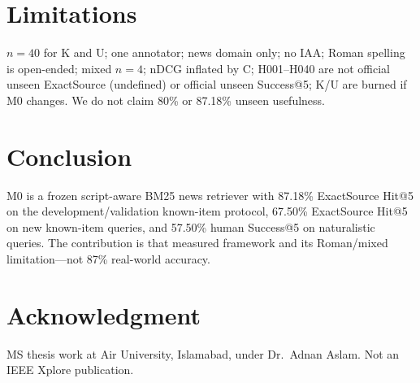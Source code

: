 \documentclass[conference]{IEEEtran}
\begin{document}
\section{Limitations}

$n=40$ for K and U; one annotator; news domain only; no IAA; Roman spelling is open-ended; mixed $n=4$; nDCG inflated by C; H001--H040 are not official unseen ExactSource (undefined) or official unseen Success@5; K/U are burned if M0 changes. We do not claim 80\% or 87.18\% unseen usefulness.

\section{Conclusion}

M0 is a frozen script-aware BM25 news retriever with 87.18\% ExactSource Hit@5 on the development/validation known-item protocol, 67.50\% ExactSource Hit@5 on new known-item queries, and 57.50\% human Success@5 on naturalistic queries. The contribution is that measured framework and its Roman/mixed limitation---not 87\% real-world accuracy.

\section*{Acknowledgment}

MS thesis work at Air University, Islamabad, under Dr.\ Adnan Aslam. Not an IEEE Xplore publication.
\end{document}
